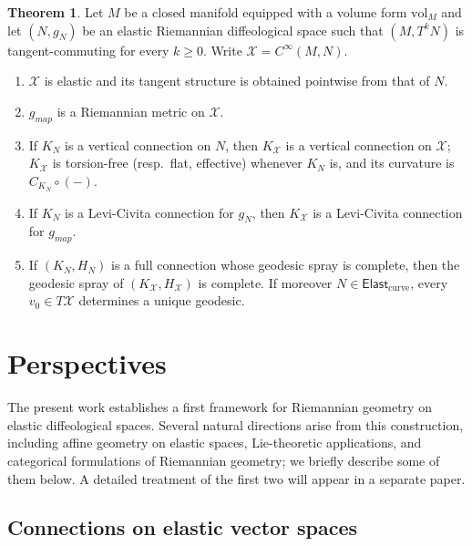 \documentclass{amsart}
\newcommand{\vol}{\mathrm{vol}}
\newcommand{\X}{\mathcal{X}}
\theoremstyle{definition}
\newtheorem{thm}{Theorem}[section]
\begin{document}
\begin{thm}\label{thm:summary-of-mapping-space}
Let $M$ be a closed manifold equipped with a volume form $\vol_M$ and let $(N,g_N)$ be an elastic Riemannian diffeological space such that $(M, T^kN)$ is tangent-commuting for every $k \ge 0$. Write $\X = C^\infty(M,N)$.
\begin{enumerate}
  \item $\X$ is elastic and its tangent structure is obtained pointwise from
    that of $N$.
  \item $g_{\mathit{map}}$ is a Riemannian metric on $\X$.
  \item If $K_N$ is a vertical connection on $N$, then $K_\X$ is a vertical connection on $\X$; $K_\X$ is torsion-free (resp.\ flat, effective) whenever $K_N$ is, and its curvature is $C_{K_N}\circ(-)$.
  \item If $K_N$ is a Levi-Civita connection for $g_N$, then $K_\X$ is a Levi-Civita connection for $g_{\mathit{map}}$.
  \item If $(K_N,H_N)$ is a full connection whose geodesic spray is complete, then the geodesic spray of $(K_\X,H_\X)$ is complete. If moreover $N \in \mathsf{Elast}_{\mathrm{curve}}$, every $v_0 \in T\X$ determines a unique geodesic.
\end{enumerate}
\end{thm}

\section{Perspectives}\label{sec:perspectives}

The present work establishes a first framework for Riemannian geometry on
elastic diffeological spaces. Several natural directions arise from this
construction, including affine geometry on elastic spaces, Lie-theoretic
applications, and categorical formulations of Riemannian geometry; we
briefly describe some of them below. A detailed treatment of the first two
will appear in a separate paper.

\subsection{Connections on elastic vector spaces}\label{subsec:elastic-vs}
\end{document}
